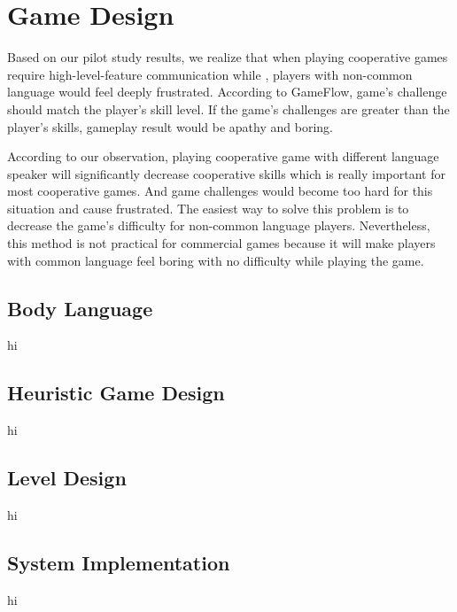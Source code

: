 \section{Game Design}


Based on our pilot study results, we realize that when playing cooperative games require high-level-feature communication while , players with non-common language would feel deeply frustrated. According to GameFlow\cite{GD1}, game's challenge should match the player's skill level. If the game's challenges are greater than the player's skills, gameplay result would be apathy and boring.


According to our observation, playing cooperative game with different language speaker will significantly decrease cooperative skills which is really important for most cooperative games. And game challenges would become too hard for this situation and cause frustrated. The easiest way to solve this problem is to decrease the game's difficulty for non-common language players. Nevertheless, this method is not practical for commercial games because it will make players with common language feel boring with no difficulty while playing the game.  

\subsection{Body Language}
hi
\subsection{Heuristic Game Design}
hi
\subsection{Level Design}
hi
\subsection{System Implementation}
hi